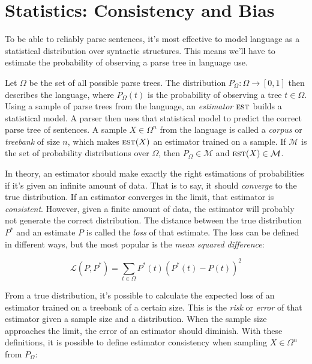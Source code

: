 \section{Statistics: Consistency and Bias}\label{sec:Statistics}


To be able to reliably parse sentences, it's most effective to model language as a statistical distribution over syntactic structures. This means we'll have to estimate the probability of observing a parse tree in language use.

Let $\Omega$ be the set of all possible parse trees. The distribution $P_\Omega: \Omega\rightarrow [0,1]$ then describes the language, where $P_\Omega(t)$ is the probability of observing a tree $t \in \Omega$. Using a sample of parse trees from the language, an \emph{estimator} $\textsc{est}$ builds a statistical model. A parser then uses that statistical model to predict the correct parse tree of sentences.
A sample $X \in \Omega^n$ from the language is called a \emph{corpus} or \emph{treebank} of size $n$, which makes $\textsc{est}(X)$ an estimator trained on a sample. If $\mathcal{M}$ is the set of probability distributions over $\Omega$, then $P_\Omega \in \mathcal{M}$ and $\textsc{est}(X) \in \mathcal{M}$.

In theory, an estimator should make exactly the right estimations of probabilities if it's given an infinite amount of data. That is to say, it should \emph{converge} to the true distribution. If an estimator converges in the limit, that estimator is \emph{consistent}.
However, given a finite amount of data, the estimator will probably not generate the correct distribution. The distance between the true distribution $P^*$ and an estimate $P$ is called the \emph{loss} of that estimate. The loss can be defined in different ways, but the most popular is the \emph{mean squared difference}:

$$ \mathcal{L}(P, P^*) =  \sum_{t \in \Omega} P^*(t) (P^*(t)-P(t))^2$$

From a true distribution, it's possible to calculate the expected loss of an estimator trained on a treebank of a certain size. This is the \emph{risk} or \emph{error} of that estimator given a sample size and a distribution. 
When the sample size approaches the limit, the error of an estimator should diminish. With these definitions, it is possible to define estimator consistency when sampling $X \in \Omega^n$ from $P_\Omega$:

